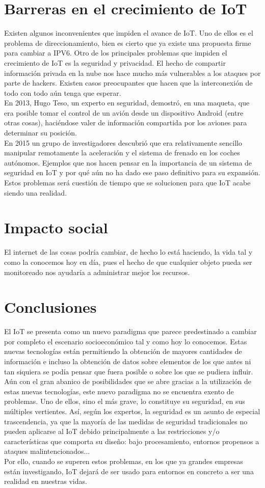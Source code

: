 \documentclass[12pt, twoside]{book}
\begin{document}
\section{Barreras en el crecimiento de IoT}
Existen algunos inconvenientes que impiden el avance de IoT. Uno de ellos es el problema de direccionamiento, bien es cierto que ya existe una propuesta firme para cambiar a IPV6. Otro de los principales problemas que impiden el crecimiento de IoT es la seguridad y privacidad. El hecho de compartir información privada en la nube nos hace mucho más vulnerables a los ataques por parte de hackers. Existen casos preocupantes que hacen que la interconexión de todo con todo aún tenga que esperar. \\En 2013, Hugo Teso, un experto en seguridad, demostró, en una maqueta, que era posible tomar el control de un avión desde un dispositivo Android (entre otras cosas), haciéndose valer de información compartida por los aviones para determinar su posición. \\En 2015 un grupo de investigadores descubrió que era relativamente sencillo manipular remotamente la aceleración y el sistema de frenado en los coches autónomos. Ejemplos que nos hacen pensar en la importancia de un sistema de seguridad en IoT y por qué aún no ha dado ese paso definitivo para su expansión. Estos problemas será cuestión de tiempo que se solucionen para que IoT acabe siendo una realidad.
\section{Impacto social}
El internet de las cosas podría cambiar, de hecho lo está haciendo, la vida tal y como la conocemos hoy en día, pues el hecho de que cualquier objeto pueda ser monitoreado nos ayudaría a administrar mejor los recursos. 

\section{Conclusiones}
El IoT se presenta como un nuevo paradigma que parece predestinado a cambiar por completo el escenario socioeconómico tal y como hoy lo conocemos. Estas nuevas tecnologías están permitiendo la obtención de mayores cantidades de información e incluso la obtención de datos sobre elementos de los que antes ni tan siquiera se podía pensar que fuera posible o sobre los que se pudiera influir.\\
Aún con el gran abanico de posibilidades que se abre gracias a la utilización de estas nuevas tecnologías, este nuevo paradigma no se encuentra exento de problemas. Uno de ellos, sino el más
grave, lo constituye su seguridad, en sus múltiples vertientes. Así, según los expertos, la seguridad es un asunto de especial trascendencia, ya que la mayoría de las medidas de seguridad tradicionales no pueden aplicarse al IoT debido principalmente a las restricciones y/o características que comporta su diseño: bajo procesamiento, entornos propensos a ataques malintencionados...\\
Por ello, cuando se superen estos problemas, en los que ya grandes empresas están investigando, IoT dejará de ser usado para entornos en concreto a ser una realidad en nuestras vidas.
\end{document}
